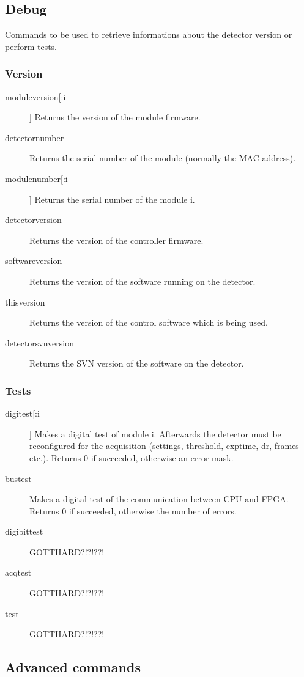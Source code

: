\documentclass{article}
\begin{document}
\subsection{Debug}
Commands to be used to retrieve informations about the detector version or perform tests.
\subsubsection{Version}
\begin{description}
\item[moduleversion[:i]]   Returns the version of the module firmware.
\item[detectornumber]  Returns the serial number of the module (normally the MAC address).
\item[modulenumber[:i]]    Returns the serial number of the module i.
\item[detectorversion]  Returns the version of the controller firmware.
\item[softwareversion] Returns the version of the software running on the detector.
\item[thisversion]  Returns the version of the control software which is being used.
\item[detectorsvnversion] Returns the SVN version of the software on the detector.
\end{description}

\subsubsection{Tests}

\begin{description}  
\item[digitest[:i]] Makes a digital test of module i.  Afterwards the detector must be reconfigured for the acquisition (settings, threshold, exptime, dr, frames etc.). Returns 0 if succeeded, otherwise an error mask.
\item[bustest] Makes a digital test of the communication between CPU and FPGA. Returns 0 if succeeded, otherwise the number of errors.
\item[digibittest]  GOTTHARD?!?!??!
\item[acqtest]  GOTTHARD?!?!??!
\item[test]  GOTTHARD?!?!??!
\end{description}



\subsection{Advanced commands}
\end{document}
